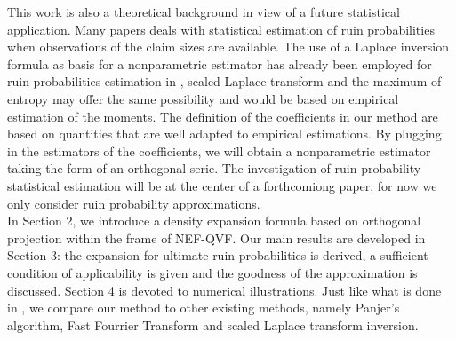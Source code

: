 This work is also a theoretical background in view of a future statistical application. Many papers deals with statistical estimation of ruin probabilities when observations of the claim sizes are available. The use of a Laplace inversion formula as basis for a nonparametric estimator has already been employed for ruin probabilities estimation in \citet{MnRuRu08,ZhYaYa14}, scaled Laplace transform and the maximum of entropy may offer the same possibility and would be based on empirical estimation of the moments. The definition of the coefficients in our method are based on quantities that are well adapted to empirical estimations. By plugging in the estimators of the coefficients, we will obtain a nonparametric estimator taking the form of an orthogonal serie. The investigation of ruin probability statistical estimation will be at the center of a forthcomiong paper, for now we only consider ruin probability approximations.\\

In Section 2, we introduce a density expansion formula based on orthogonal projection within the frame of NEF-QVF. Our main results are developed in Section 3: the expansion for ultimate ruin probabilities is derived, a sufficient condition of applicability is given and the goodness of the approximation is discussed. Section 4 is devoted to numerical illustrations. Just like what is done in \citet{GzNITa13},  we compare our method to other existing methods, namely Panjer's algorithm, Fast Fourrier Transform and scaled Laplace transform inversion.
